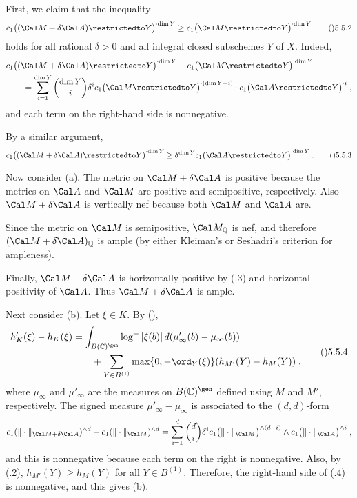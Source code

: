  First, we claim that the inequality
$$c_1\bigl((\Cal M+\delta\Cal A)\restrictedto Y\bigr)^{{}\cdot\dim Y}
  \ge c_1\bigl(\Cal M\restrictedto Y\bigr)^{{}\cdot\dim Y}\tag\05.5.2$$
holds for all rational $\delta>0$ and all integral closed subschemes $Y$ of $X$.
Indeed,
$$\split & c_1\bigl((\Cal M+\delta\Cal A)\restrictedto Y\bigr)^{{}\cdot\dim Y}
  - c_1\bigl(\Cal M\restrictedto Y\bigr)^{{}\cdot\dim Y} \\
  &\qquad= \sum_{i=1}^{\dim Y} \binom{\dim Y}{i}
    \delta^i c_1\bigl(\Cal M\restrictedto Y\bigr)^{{}\cdot(\dim Y-i)}
      \cdot c_1\bigl(\Cal A\restrictedto Y\bigr)^{{}\cdot i}\;,\endsplit$$
and each term on the right-hand side is nonnegative.

By a similar argument,
$$c_1\bigl((\Cal M+\delta\Cal A)\restrictedto Y\bigr)^{{}\cdot\dim Y}
  \ge \delta^{\dim Y} c_1\bigl(\Cal A\restrictedto Y\bigr)^{{}\cdot\dim Y}\;.
  \tag\05.5.3$$

Now consider (a).  The metric on $\Cal M+\delta\Cal A$ is positive because the
metrics on $\Cal A$ and $\Cal M$ are positive and semipositive, respectively.
Also $\Cal M+\delta\Cal A$ is vertically nef because both
$\Cal M$ and $\Cal A$ are.

Since the metric on $\Cal M$ is semipositive, $\Cal M_{\Bbb Q}$ is nef,
and therefore $(\Cal M+\delta\Cal A)_{\Bbb Q}$ is ample (by either Kleiman's
or Seshadri's criterion for ampleness).

Finally, $\Cal M+\delta\Cal A$ is horizontally positive by (.3) and
horizontal positivity of $\Cal A$.  Thus $\Cal M+\delta\Cal A$ is ample.

Next consider (b).  Let $\xi\in K$.  By (),
$$\split h'_K(\xi) - h_K(\xi)
  &= \int_{B(\Bbb C)^\gen} \log^{+}|\xi(b)|
      \,d(\mu'_\infty(b)-\mu_\infty(b)) \\
  &\qquad+ \sum_{Y\in B^{(1)}} \max\{0,-\ord_Y(\xi)\}(h_{M'}(Y)-h_M(Y))\;,
  \endsplit\tag\05.5.4$$
where $\mu_\infty$ and $\mu'_\infty$ are the measures on
$B(\Bbb C)^\gen$ defined using $M$ and $M'$, respectively.
The signed measure $\mu'_\infty-\mu_\infty$ is associated to the
$(d,d)$\snug-form
$$c_1(\|\cdot\|_{\Cal M+\delta\Cal A})^{{}\wedge d}
    - c_1(\|\cdot\|_{\Cal M})^{{}\wedge d}
  = \sum_{i=1}^d \binom di
    \delta^i c_1\bigl(\|\cdot\|_{\Cal M}\bigr)^{{}\wedge(d-i)}
      \wedge c_1\bigl(\|\cdot\|_{\Cal A}\bigr)^{{}\wedge i}\;,$$
and this is nonnegative because each term on the right is nonnegative.
Also, by (.2), $h_{M'}(Y)\ge h_M(Y)$ for all $Y\in B^{(1)}$.
Therefore, the right-hand side of (.4) is nonnegative, and this gives (b).

